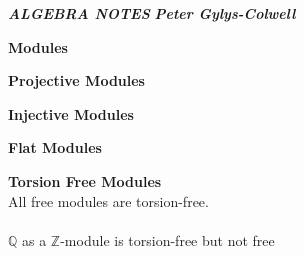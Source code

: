 \documentclass[12pt]{article}
\newenvironment{ques}[1]{\textbf{#1}\vspace{1 mm}\\ }{\bigskip}
\theoremstyle{definition}
\newcommand{\Q}{\mathbb Q}
\newcommand{\Z}{\mathbb Z}
\begin{document}
\noindent \hspace{1.3cm}
\textit{\textbf{ALGEBRA NOTES}} \hspace{1.3cm} \textit{\textbf{Peter
Gylys-Colwell}} 

\vspace{1cm}

\begin{ques}{Modules}



\end{ques}

\begin{ques}{Projective Modules}




\end{ques}

\begin{ques}{Injective Modules}




\end{ques}

\begin{ques}{Flat Modules}




\end{ques}


\begin{ques}{Torsion Free Modules}
	All free modules are torsion-free.\\
	\\
	$\Q$ as a $\Z$-module is torsion-free but not free


\end{ques}
\end{document}
